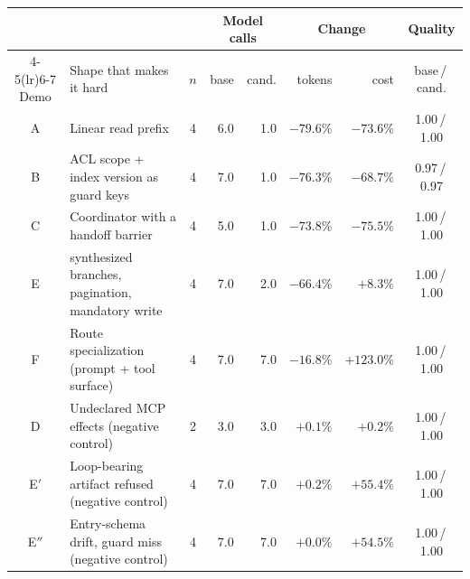 \begin{tabularx}{\linewidth}{@{}c >{\raggedright\arraybackslash}X c r r r r c@{}}
\toprule
& & & \multicolumn{2}{c}{Model calls} & \multicolumn{2}{c}{Change} & Quality \\
\cmidrule(lr){4-5}\cmidrule(lr){6-7}
Demo & Shape that makes it hard & $n$ & base & cand. & tokens & cost & base\,/\,cand. \\
\midrule
A & Linear read prefix & 4 & 6.0 & 1.0 & $-79.6\%$ & $-73.6\%$ & 1.00\,/\,1.00 \\
B & ACL scope + index version as guard keys & 4 & 7.0 & 1.0 & $-76.3\%$ & $-68.7\%$ & 0.97\,/\,0.97 \\
C & Coordinator with a handoff barrier & 4 & 5.0 & 1.0 & $-73.8\%$ & $-75.5\%$ & 1.00\,/\,1.00 \\
E & 3 synthesized branches, pagination, mandatory write & 4 & 7.0 & 2.0 & $-66.4\%$ & $+8.3\%$ & 1.00\,/\,1.00 \\
F & Route specialization (prompt + tool surface) & 4 & 7.0 & 7.0 & $-16.8\%$ & $+123.0\%$ & 1.00\,/\,1.00 \\
D & Undeclared MCP effects (negative control) & 2 & 3.0 & 3.0 & $+0.1\%$ & $+0.2\%$ & 1.00\,/\,1.00 \\
E$'$ & Loop-bearing artifact refused (negative control) & 4 & 7.0 & 7.0 & $+0.2\%$ & $+55.4\%$ & 1.00\,/\,1.00 \\
E$''$ & Entry-schema drift, guard miss (negative control) & 4 & 7.0 & 7.0 & $+0.0\%$ & $+54.5\%$ & 1.00\,/\,1.00 \\
\bottomrule
\end{tabularx}
